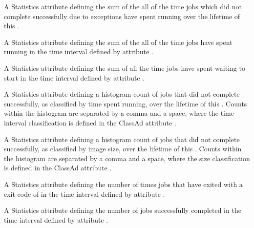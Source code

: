 \begin{description}
\item[\AdAttr{JobsAccumExceptionalBadputTime}:] A Statistics attribute 
  defining the sum of the all of the time jobs which did not complete 
  successfully due to  exceptions 
  have spent running over the lifetime of this .

\item[\AdAttr{JobsAccumRunningTime}:]  A Statistics attribute defining
  the sum of the all of the time jobs have spent running
  in the time interval defined by attribute .

\item[\AdAttr{JobsAccumTimeToStart}:] A Statistics attribute defining
  the sum of all the time jobs have spent waiting to start
  in the time interval defined by attribute .

\item[\AdAttr{JobsBadputRuntimes}:] A Statistics attribute defining
  a histogram count of jobs that did not complete successfully, 
  as classified by time spent running,
  over the lifetime of this .
  Counts within the histogram are separated by a comma and a space, 
  where the time interval classification is defined in the ClassAd attribute
  .

\item[\AdAttr{JobsBadputSizes}:] A Statistics attribute defining
  a histogram count of jobs that did not complete successfully,
  as classified by image size,
  over the lifetime of this .
  Counts within the histogram are separated by a comma and a space, 
  where the size classification is defined in the ClassAd attribute
  .

\item[\AdAttr{JobsCheckpointed}:] A Statistics attribute defining
  the number of times jobs that have exited 
  with a  exit code of 
  in the time interval defined by attribute .

\item[\AdAttr{JobsCompleted}:] A Statistics attribute defining
  the number of jobs successfully completed
  in the time interval defined by attribute .


\end{description}
